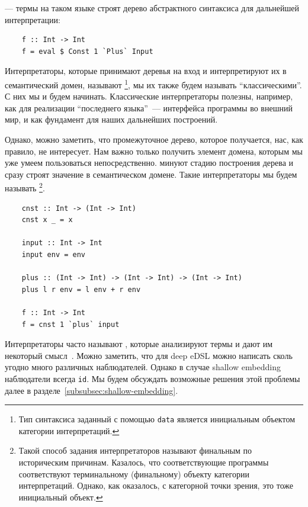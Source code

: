  --- термы на таком языке строят дерево абстрактного синтаксиса для дальнейшей интерпретации:
\begin{verbatim}
    f :: Int -> Int
    f = eval $ Const 1 `Plus` Input
\end{verbatim}

Интерпретаторы, которые принимают деревья на вход и интерпретируют их в семантический домен, называют \footnote{Тип синтаксиса заданный с помощью \texttt{data} является инициальным объектом категории интерпретаций.}, мы их также будем называть ``классическими''.
С них мы и будем начинать.
Классические интерпретаторы полезны, например, как для реализации ``последнего языка''~--- интерфейса программы во внешний мир, и как фундамент для наших дальнейших построений.

%

Однако, можно заметить, что промежуточное дерево, которое получается, нас, как правило, не интересует.
Нам важно только получить элемент домена, которым мы уже умеем пользоваться непосредственно.
 минуют стадию построения дерева и сразу строят значение в семантическом домене.
Такие интерпретаторы мы будем называть \footnote{Такой способ задания интерпретаторов называют финальным по историческим причинам. Казалось, что соответствующие программы соответствуют терминальному (финальному) объекту категории интерпретаций. Однако, как оказалось, с категорной точки зрения, это тоже инициальный объект.}.
\begin{verbatim}
    cnst :: Int -> (Int -> Int)
    cnst x _ = x

    input :: Int -> Int
    input env = env

    plus :: (Int -> Int) -> (Int -> Int) -> (Int -> Int)
    plus l r env = l env + r env

    f :: Int -> Int
    f = cnst 1 `plus` input
\end{verbatim}

Интерпретаторы часто называют , которые анализируют термы и дают им некоторый смысл~\cite{gibbons2013functional}.
Можно заметить, что для deep eDSL можно написать сколь угодно много различных наблюдателей.
Однако в случае shallow embedding наблюдатели всегда \texttt{id}.
Мы будем обсуждать возможные решения этой проблемы далее в разделе~\ref{subsubsec:shallow-embedding}.

